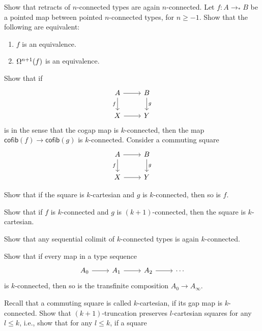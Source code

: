 \begin{exercises}
\exercise Show that retracts of $n$-connected types are again $n$-connected.
\exercise Let $f:A\to_\ast B$ be a pointed map between pointed $n$-connected types, for $n\geq -1$. Show that the following are equivalent:
\begin{enumerate}
\item $f$ is an equivalence.
\item $\loopspace[n+1]{f}$ is an equivalence. 
\end{enumerate}
\exercise Show that if
\begin{equation*}
\begin{tikzcd}
A \arrow[r] \arrow[d,swap,"f"] & B \arrow[d,"g"] \\
X \arrow[r] & Y
\end{tikzcd}
\end{equation*}
is  in the sense that the cogap map is $k$-connected, then the map $\mathsf{cofib}(f)\to \mathsf{cofib}(g)$ is $k$-connected.
\exercise Consider a commuting square
\begin{equation*}
\begin{tikzcd}
A \arrow[d,swap,"f"] \arrow[r] & B \arrow[d,"g"] \\
X \arrow[r] & Y
\end{tikzcd}
\end{equation*}
\begin{subexenum}
\item Show that if the square is $k$-cartesian and $g$ is $k$-connected, then so is $f$.
\item Show that if $f$ is $k$-connected and $g$ is $(k+1)$-connected, then the square is $k$-cartesian. 
\end{subexenum}
\exercise
\begin{subexenum}
\item Show that any sequential colimit of $k$-connected types is again $k$-connected.
\item Show that if every map in a type sequence
  \begin{equation*}
    \begin{tikzcd}
      A_0\arrow[r] & A_1 \arrow[r] & A_2 \arrow[r] & \cdots
    \end{tikzcd}
  \end{equation*}
  is $k$-connected, then so is the transfinite composition $A_0\to A_\infty$.
\end{subexenum}
\exercise Recall that a commuting square is called $k$-cartesian, if its gap map is $k$-connected. Show that $(k+1)$-truncation preserves $l$-cartesian squares for any $l\leq k$, i.e., show that for any $l\leq k$, if a square

\end{exercises}
